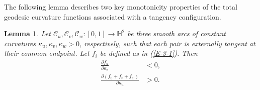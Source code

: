 \documentclass[11pt,leqno]{article}
\numberwithin{equation}{section}
\newtheorem{lemma}[theorem]{Lemma}
\theoremstyle{definition}
\begin{document}
The following lemma describes two key monotonicity properties of the total geodesic curvature functions associated with a tangency configuration.
\begin{lemma}\label{L-3-5}
Let $\mathcal C_u,\mathcal C_v,\mathcal C_w: [0,1]\to\mathbb{H}^2$ be three smooth arcs of constant curvatures $\kappa_u, \kappa_v, \kappa_w>0$, respectively, such that each pair is externally tangent at their common endpoint.
Let $f_i$ be defined as in (\ref{E-3-1}). Then
\begin{subequations}
\begin{align}
\label{E-3-9a}\frac{\partial f_u}{\partial \kappa_v}&<0,\\
\label{E-3-9b}\frac{\partial(f_u+f_v+f_w)}{\partial \kappa_u}&>0.
 \end{align}\end{subequations}
\end{lemma}
\end{document}
